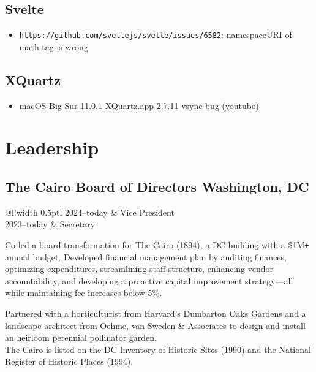 \documentclass[]{article}
\newcommand\VRule{\color{lightgray}\vrule width 0.5pt}
\def\Plus{\texttt{+}}
\begin{document}
\subsection*{Svelte}

\begin{itemize}
	\item \href{https://github.com/sveltejs/svelte/issues/6582#issuecomment-922352305}{\texttt{https://github.com/sveltejs/svelte/issues/6582}}: namespaceURI of math tag is wrong
\end{itemize}

\subsection*{XQuartz}

\begin{itemize}
	\item macOS Big Sur 11.0.1 XQuartz.app 2.7.11 vsync bug (\href{https://www.youtube.com/watch?v=IaPh4tc0_B0}{youtube})
\end{itemize}

\newpage

\section*{Leadership}
\subsection*{The Cairo Board of Directors \hfill \textnormal{Washington, DC}}

\begin{tabular}{@{}l!{\VRule}l}
{\footnotesize 2024--today} & Vice President\\
{\footnotesize 2023--today} & Secretary\\
\end{tabular}

\begin{minipage}[t]{0.48\linewidth}
	Co-led a board transformation for The Cairo (1894), a DC building with a \$1M{\Plus} annual budget. Developed financial management plan by auditing finances, optimizing expenditures, streamlining staff structure, enhancing vendor accountability, and developing a proactive capital improvement strategy—all while maintaining fee increases below 5\%.
\end{minipage}
\hfill
\begin{minipage}[t]{0.48\linewidth}
	Partnered with a horticulturist from Harvard’s Dumbarton Oaks Gardens and a landscape architect from Oehme, van Sweden \& Associates to design and install an heirloom perennial pollinator garden.\\
	The Cairo is listed on the DC Inventory of Historic Sites (1990) and the National Register of Historic Places (1994).
\end{minipage}
\end{document}
